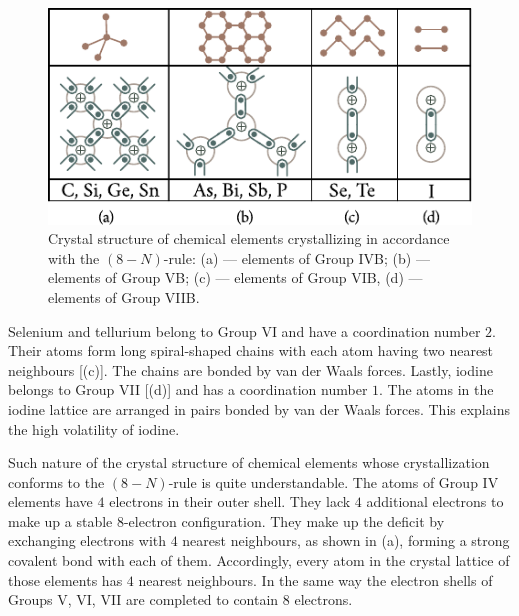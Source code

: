 \begin{figure}[t]
	\begin{center}
		\includegraphics[scale=1.0]{figures/ch_01/fig_1_19.pdf}
		\caption[]{Crystal structure of chemical elements crystallizing in accordance with the $(8-N)$-rule: (a) --- elements of Group IVB; (b) --- elements of Group VB; (c) --- elements of Group VIB, (d) --- elements of Group VIIB.}
		\label{fig:1_19}
	\end{center}
	\vspace{-0.7cm}
\end{figure}

Selenium and tellurium belong to Group VI and have a coordination number $2$. Their atoms form long spiral-shaped chains with each atom having two nearest neighbours [(c)]. The chains are bonded by van der Waals forces. Lastly, iodine belongs to Group VII [(d)] and has a coordination number $1$. The atoms in the iodine lattice are arranged in pairs bonded by van der Waals forces. This explains the high volatility of iodine.

Such nature of the crystal structure of chemical elements whose crystallization conforms to the $(8-N)$-rule is quite understandable. The atoms of Group IV elements have $4$ electrons in their outer shell. They lack $4$ additional electrons to make up a stable $8$-electron configuration. They make up the deficit by exchanging electrons with $4$ nearest neighbours, as shown in (a), forming a strong covalent bond with each of them. Accordingly, every atom in the crystal lattice of those elements has $4$ nearest neighbours. In the same way the electron shells of Groups V, VI, VII are completed to contain $8$ electrons.

